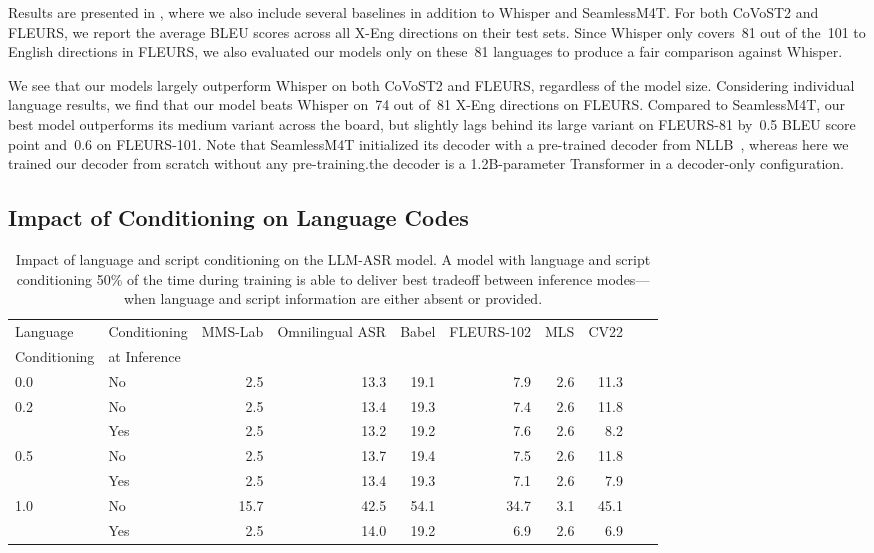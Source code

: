 \documentclass[]{fairmeta}
\begin{document}
Results are presented in , where we also include several baselines in addition to Whisper and SeamlessM4T.  For both CoVoST2 and FLEURS, we report the average BLEU scores across all X-Eng directions on their test sets. Since Whisper only covers~81 out of the~101 to English directions in FLEURS, we also evaluated our models only on these~81 languages to produce a fair comparison against Whisper.

We see that our models largely outperform Whisper on both CoVoST2 and FLEURS, regardless of the model size.
Considering individual language results, we find that our model beats Whisper on~74 out of~81 X-Eng directions on FLEURS.  Compared to SeamlessM4T, our best model outperforms its medium variant across the board, but slightly lags behind its large variant on FLEURS-81 by~0.5 BLEU score point and~0.6 on FLEURS-101. Note that SeamlessM4T initialized its decoder with a pre-trained decoder from NLLB~\citep{NLLB2024}, whereas here we trained our decoder from scratch without any pre-training.the decoder is a 1.2B-parameter Transformer in a decoder-only configuration.



\subsection{Impact of Conditioning on Language Codes}   
\label{sec:lid_results}

\begin{table}[ht]
\centering
\begin{tabular}{llrrrrrrrr}
\toprule
Language  & Conditioning & MMS-Lab & Omnilingual ASR & Babel & FLEURS-102 & MLS & CV22 \\
Conditioning & at Inference \\
\midrule
       0.0 & No    & 2.5  &	13.3 &	19.1 &	7.9 &	2.6 &	11.3 \\
       0.2 & No    & 2.5	& 13.4	& 19.3	& 7.4	& 2.6	& 11.8 \\
       & Yes               & 2.5 & 	13.2	& 19.2	& 7.6	& 2.6& 	8.2 \\
       0.5 & No            & 2.5 &	13.7	& 19.4 &	7.5 &	2.6 &	11.8 \\
       & Yes               & 2.5	& 13.4	& 19.3	& 7.1 &	2.6 &	7.9 \\
       1.0 & No            & 15.7	& 42.5	& 54.1	& 34.7	& 3.1	& 45.1 \\
       & Yes               & 2.5	& 14.0	& 19.2	& 6.9	& 2.6	& 6.9 \\
\bottomrule
\end{tabular}
\caption{Impact of language and script conditioning on the LLM-ASR model. A model with language and script conditioning 50\% of the time during training is able to deliver best tradeoff between inference modes—when language and script information are either absent or provided.}
\label{tab:lid}
\end{table}
\end{document}

